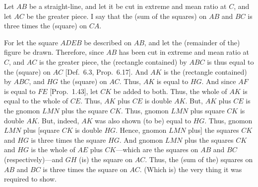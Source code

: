 \begin{Parallel}{}{}
{\epsfysize=2.5in
\centerline{}

Let $AB$ be a straight-line, and let it be cut in extreme and mean
ratio at $C$, and let $AC$ be the greater piece. I say that the (sum of the
squares) on $AB$ and $BC$ is three times the (square) on $CA$.

For let the square $ADEB$ be described on $AB$, and
let the (remainder of the) figure be drawn. Therefore, since
$AB$ has been cut in extreme and mean ratio at $C$,  and $AC$ is the greater piece, the (rectangle contained) by $ABC$ is thus equal to the
(square) on $AC$ [Def.~6.3, Prop.~6.17]. And $AK$ is the (rectangle
contained) by $ABC$, and $HG$ the (square) on $AC$. Thus,
$AK$ is equal to $HG$.  And since $AF$ is equal to $FE$ [Prop.~1.43],
let $CK$ be added to both. Thus, the whole of $AK$  is equal to
the whole of $CE$. Thus, $AK$ plus $CE$ is double $AK$. But, $AK$
plus $CE$ is the gnomon $LMN$ plus the square $CK$. Thus, 
gnomon $LMN$ plus square $CK$ is double $AK$. But, indeed,
$AK$ was also shown (to be) equal to $HG$. Thus, gnomon $LMN$
plus [square $CK$ is double $HG$. Hence, gnomon $LMN$ plus] the
 squares $CK$ and $HG$ is three times the square $HG$.
And  gnomon $LMN$ plus the  squares  $CK$ and
$HG$ is the whole of $AE$ plus $CK$---which are the 
squares on $AB$ and $BC$ (respectively)---and $GH$ (is) the square on $AC$. 
Thus, the (sum of the) squares on $AB$ and $BC$ is three times the
square on $AC$. (Which is) the very thing it was required to show.}
\end{Parallel}

